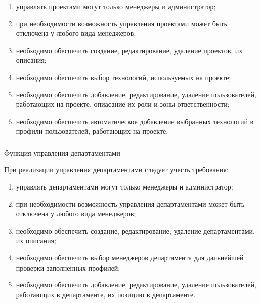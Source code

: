 \begin{enumerate}
	\item управлять проектами могут только менеджеры и администратор;
	\item при необходимости возможность управления проектами может быть отключена у любого вида менеджеров;
  \item необходимо обеспечить создание, редактирование, удаление проектов, их описания;
  \item необходимо обеспечить выбор технологий, используемых на проекте;
  \item необходимо обеспечить добавление, редактирование, удаление пользователей, работающих на проекте, опиасание их
  роли и зоны ответственности;
  \item необходимо обеспечить автоматическое добавление выбранных технологий в профили пользователей, работающих на
  проекте.
\end{enumerate}

\subsubsection{} Функция управления департаментами
\label{sec:domain:specification:departments}

При реализации управления департаментами следует учесть требования:

\begin{enumerate}
	\item управлять департаментами могут только менеджеры и администратор;
	\item при необходимости возможность управления департаментами может быть отключена у любого вида менеджеров;
  \item необходимо обеспечить создание, редактирование, удаление департаментами, их описания;
  \item необходимо обеспечить выбор менеджеров департамента для дальнейшей проверки заполненных профилей;
  \item необходимо обеспечить добавление, редактирование, удаление пользователей, работающих в департаменте, их позицию
  в департаменте.
\end{enumerate}
